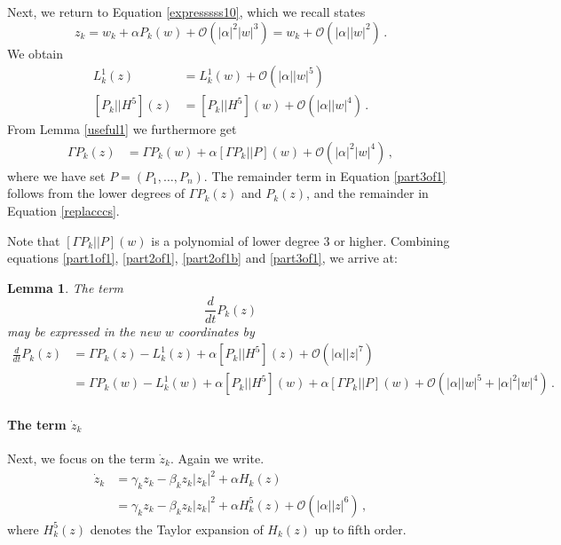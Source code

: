 \documentclass[12pt]{article}
\renewcommand{\mathcal}{\mathscr}
\theoremstyle{plain}
\newtheorem{lem}[thr]{Lemma}
\theoremstyle{definition}
\theoremstyle{remark}
\theoremstyle{remark}
\begin{document}
 Next, we return to Equation \eqref{expresssss10}, which we recall states
\begin{equation}\label{replacccs}
z_k = w_k + \alpha P_k(w) + \mathcal{O}(|\alpha|^2|w|^3) =  w_k  + \mathcal{O}(|\alpha||w|^2)  \, .
\end{equation}
We obtain
\begin{align}\label{part2of1}
    L^1_k(z) &= L^1_k(w) + \mathcal{O}(|\alpha||w|^5) \\ \label{part2of1b}
    [P_k|| {H}^5](z) &= [P_k|| {H}^5](w) + \mathcal{O}(|\alpha||w|^4) \, .
\end{align}
From Lemma \ref{useful1} we furthermore get
\begin{align}\label{part3of1}
    \Gamma P_k(z) &= \Gamma P_k(w) + \alpha [\Gamma P_k||P](w) + \mathcal{O}(|\alpha|^2|w|^4) \, ,
\end{align}
where we have set $P = (P_1, \dots, P_n)$. The remainder term in Equation \eqref{part3of1} follows from the lower degrees of $\Gamma P_k(z)$ and $P_k(z)$, and the remainder in Equation \eqref{replacccs}.

Note  that $[\Gamma P_k||P](w)$ is a polynomial of lower degree $3$ or higher. Combining equations \eqref{part1of1}, \eqref{part2of1}, \eqref{part2of1b} and \eqref{part3of1}, we arrive at:

\begin{lem}\label{part1}
The term 
\[\frac{d}{dt}P_k(z) \]
may be expressed in the new $w$ coordinates by
\begin{align}
\frac{d}{dt}P_k(z) &=  \Gamma P_k(z) - L^1_k(z) + \alpha [P_k|| {H}^5](z) + \mathcal{O}(|\alpha||z|^7) \\ \nonumber
&=  \Gamma P_k(w) - L^1_k(w) + \alpha [P_k|| {H}^5](w) + \alpha [\Gamma P_k||P](w) + \mathcal{O}(|\alpha||w|^5 + |\alpha|^2|w|^4)\, .
\end{align}
\end{lem}


\paragraph{The term $\dot{z}_k$}\label{secondterm} 

\noindent Next, we focus on the term $\dot{z}_k$. Again we write.
\begin{align}
\dot{z}_k   &= \gamma_kz_k - \beta_k z_k|z_k|^2 + \alpha H_k(z) \\ \nonumber
            &= \gamma_kz_k - \beta_k z_k|z_k|^2 + \alpha H_k^5(z) + \mathcal{O}(|\alpha||z|^6)\, ,
\end{align}
where ${H}^5_k(z)$  denotes the Taylor expansion of $H_k(z)$ up to fifth order.
\end{document}
